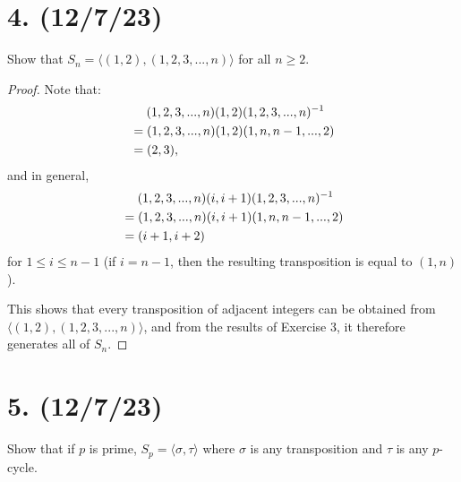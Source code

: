 \documentclass{article}
\begin{document}
\section*{4. (12/7/23)}

Show that $S_n = \langle (1, 2), (1, 2, 3, ..., n) \rangle$ for all $n \geq 2$.

\begin{proof}
    Note that:
    \begin{align*}
        & \hspace{1.3em} (1, 2, 3, ..., n)(1, 2)(1, 2, 3, ..., n)^{-1} \\
        &= (1, 2, 3, ..., n)(1, 2)(1, n, n - 1, ..., 2) \\
        &= (2, 3),
    \end{align*}
    and in general,
    \begin{align*}
        & \hspace{1.3em} (1, 2, 3, ..., n)(i, i + 1)(1, 2, 3, ..., n)^{-1} \\
        &= (1, 2, 3, ..., n)(i, i + 1)(1, n, n - 1, ..., 2) \\
        &= (i + 1, i + 2)
    \end{align*}
    for $1 \leq i \leq n - 1$ (if $i = n - 1$, then the resulting transposition is equal to $(1, n)$).

    This shows that every transposition of adjacent integers can be obtained from $\langle (1, 2), (1, 2, 3, ..., n) \rangle$, and from the results of Exercise 3, it therefore generates all of $S_n$.
\end{proof}

\section*{5. (12/7/23)}

Show that if $p$ is prime, $S_p = \langle \sigma, \tau \rangle$ where $\sigma$ is any transposition and $\tau$ is any $p$-cycle.
\end{document}

